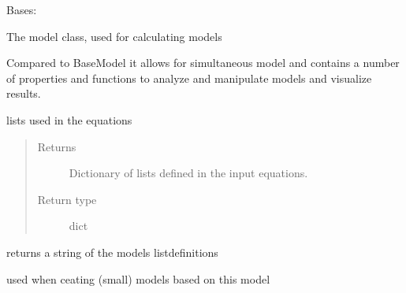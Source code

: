 \documentclass[letterpaper,10pt,english]{sphinxmanual}
\begin{document}
\begin{fulllineitems}
\label{\detokenize{core/modelclass:modelclass.Org_model_Mixin}}
\pysigstartsignatures
{}
\pysigstopsignatures
\sphinxAtStartPar
Bases: 

\sphinxAtStartPar
The model class, used for calculating models

\sphinxAtStartPar
Compared to BaseModel it allows for simultaneous model and contains a number of properties
and functions to analyze and manipulate models and visualize results.

\begin{fulllineitems}
\label{\detokenize{core/modelclass:modelclass.Org_model_Mixin.lister}}
\pysigstartsignatures
{}
\pysigstopsignatures
\sphinxAtStartPar
lists used in the equations
\begin{quote}\begin{description}
\item[{Returns}] \leavevmode
\sphinxAtStartPar
Dictionary of lists defined in the input equations.

\item[{Return type}] \leavevmode
\sphinxAtStartPar
dict

\end{description}\end{quote}

\end{fulllineitems}


\begin{fulllineitems}
\label{\detokenize{core/modelclass:modelclass.Org_model_Mixin.listud}}
\pysigstartsignatures
{}
\pysigstopsignatures
\sphinxAtStartPar
returns a string of the models listdefinitions

\sphinxAtStartPar
used when ceating (small) models based on this model

\end{fulllineitems}


\end{fulllineitems}
\end{document}

